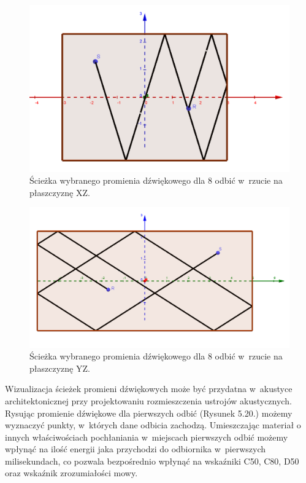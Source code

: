 \begin{figure}[h]
        \centering
                \centering
                \includegraphics[width=12cm]{odbiciay}
	\caption{Ścieżka wybranego promienia dźwiękowego dla 8 odbić w~rzucie na płaszczyznę XZ.}
\end{figure}

\begin{figure}[h]
        \centering
                \centering
                \includegraphics[width=12cm]{odbiciax}
	\caption{Ścieżka wybranego promienia dźwiękowego dla 8 odbić w~rzucie na płaszczyznę YZ.}
\end{figure}

Wizualizacja ścieżek promieni dźwiękowych może być przydatna w~akustyce architektonicznej przy projektowaniu rozmieszczenia ustrojów akustycznych. Rysując promienie dźwiękowe dla pierwszych odbić (Rysunek 5.20.) możemy wyznaczyć punkty, w~których dane odbicia zachodzą. Umieszczając materiał o innych właściwościach pochłaniania w~miejscach pierwszych odbić możemy wpłynąć na ilość energii jaka przychodzi do odbiornika w~pierwszych milisekundach, co pozwala bezpośrednio wpłynąć na wskaźniki C50, C80, D50 oraz wskaźnik zrozumiałości mowy.

